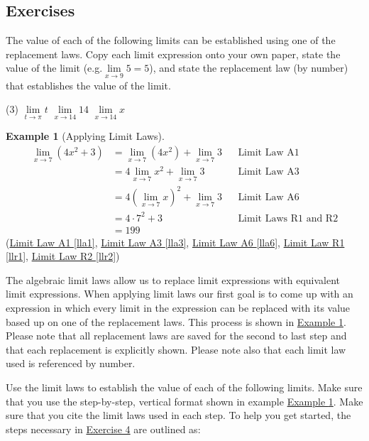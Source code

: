 \documentclass[10pt,oneside,]{book}
\theoremstyle{plain}
\theoremstyle{definition}
\newtheorem{example}[theorem]{Example}
\numberwithin{equation}{section}
\begin{document}
\subsection[Exercises]{Exercises}\label{exercises-6}
The value of each of the following limits can be established using one of the replacement laws. Copy each limit expression onto your own paper, state the value of the limit (e.g.\@ \(\lim\limits_{x\to9}5=5\)), and state the replacement law (by number) that establishes the value of the limit.%
\par
\begin{exercisegroup}(3)
\exercise[1.]\hypertarget{exercise-66}{\null}\(\lim\limits_{t\to\pi}t\)%
\exercise[2.]\hypertarget{exercise-67}{\null}\(\lim\limits_{x\to14}14\)%
\exercise[3.]\hypertarget{exercise-68}{\null}\(\lim\limits_{x\to14}x\)%
\end{exercisegroup}
\par\smallskip\noindent
\begin{example}[Applying Limit Laws]\label{example-apply-limit-laws}
\begin{align*}
\lim_{x\to7}\left(4x^2+3\right)&=\lim_{x\to7}\left(4x^2\right)+\lim_{x\to7}3&&\text{Limit Law A1}\\
&=4\lim_{x\to7}x^2+\lim_{x\to7}3&&\text{Limit Law A3}\\
&=4\left(\lim_{x\to7}x\right)^2+\lim_{x\to7}3&&\text{Limit Law A6}\\
&=4\cdot7^2+3&&\text{Limit Laws R1 and R2}\\
&=199
\end{align*}(\hyperref[lla1]{Limit Law A1 \ref{lla1}}, \hyperref[lla3]{Limit Law A3 \ref{lla3}}, \hyperref[lla6]{Limit Law A6 \ref{lla6}}, \hyperref[llr1]{Limit Law R1 \ref{llr1}}, \hyperref[llr2]{Limit Law R2 \ref{llr2}})%
\end{example}
The algebraic limit laws allow us to replace limit expressions with equivalent limit expressions. When applying limit laws our first goal is to come up with an expression in which every limit in the expression can be replaced with its value based up on one of the replacement laws. This process is shown in \hyperref[example-apply-limit-laws]{Example \ref{example-apply-limit-laws}}. Please note that all replacement laws are saved for the second to last step and that each replacement is explicitly shown. Please note also that each limit law used is referenced by number.%
\par
Use the limit laws to establish the value of each of the following limits. Make sure that you use the step-by-step, vertical format shown in example \hyperref[example-apply-limit-laws]{Example \ref{example-apply-limit-laws}}. Make sure that you cite the limit laws used in each step. To help you get started, the steps necessary in \hyperlink{exercise-first-apply-limit-laws}{Exercise 4} are outlined as:%
\end{document}
